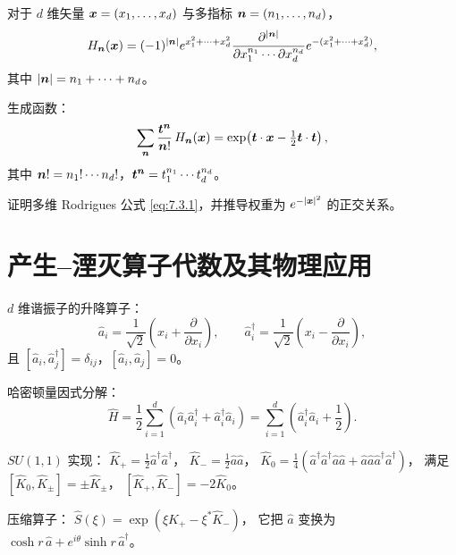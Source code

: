 对于 $d$ 维矢量 $\bm{x}=(x_1,\dots,x_d)$ 与多指标
$\bm{n}=(n_1,\dots,n_d)$，
\begin{equation}
H_{\bm{n}}(\bm{x}) = (-1)^{|\bm{n}|}
e^{x_1^2+\cdots+x_d^2}
\frac{\partial^{|\bm{n}|}}{\partial x_1^{n_1}\cdots\partial x_d^{n_d}}
e^{-(x_1^2+\cdots+x_d^2)},
\label{eq:7.3.1}
\end{equation}
其中 $|\bm{n}|=n_1+\cdots+n_d$。

生成函数：
\begin{equation}
\sum_{\bm{n}}\frac{\bm{t}^{\bm{n}}}{\bm{n}!}\,
H_{\bm{n}}(\bm{x})
= \exp\!\left(\bm{t}\cdot\bm{x} - \tfrac12\bm{t}\cdot\bm{t}\right),
\label{eq:7.3.2}
\end{equation}
其中 $\bm{n}! = n_1!\cdots n_d!$，$\bm{t}^{\bm{n}}=t_1^{n_1}\cdots t_d^{n_d}$。

\begin{exercise}
证明多维 Rodrigues 公式 \eqref{eq:7.3.1}，并推导权重为 $e^{-|\bm{x}|^2}$ 的正交关系。
\end{exercise}

\section{产生--湮灭算子代数及其物理应用}

$d$ 维谐振子的升降算子：
\begin{equation}
\hat a_i = \frac{1}{\sqrt{2}}\!\left(x_i + \frac{\partial}{\partial x_i}\right),\qquad
\hat a_i^\dagger = \frac{1}{\sqrt{2}}\!\left(x_i - \frac{\partial}{\partial x_i}\right),
\label{eq:7.4.1}
\end{equation}
且 $[\hat a_i,\hat a_j^\dagger]=\delta_{ij}$，$[\hat a_i,\hat a_j]=0$。

哈密顿量因式分解：
\begin{equation}
\hat H = \frac12\sum_{i=1}^d (\hat a_i\hat a_i^\dagger + \hat a_i^\dagger\hat a_i)
= \sum_{i=1}^d \left(\hat a_i^\dagger\hat a_i + \frac12\right).
\label{eq:7.4.2}
\end{equation}

$SU(1,1)$ 实现：
$\hat K_+=\frac12\hat a^\dagger\hat a^\dagger$，
$\hat K_-=\frac12\hat a\hat a$，
$\hat K_0=\frac14(\hat a^\dagger\hat a^\dagger\hat a\hat a + \hat a\hat a\hat a^\dagger\hat a^\dagger)$，
满足 $[\hat K_0,\hat K_\pm]=\pm\hat K_\pm$，
$[\hat K_+,\hat K_-]=-2\hat K_0$。

压缩算子：
$\hat S(\xi)=\exp(\xi\hat K_+ - \xi^*\hat K_-)$，
它把 $\hat a$ 变换为 $\cosh r\,\hat a + e^{i\theta}\sinh r\,\hat a^\dagger$。

